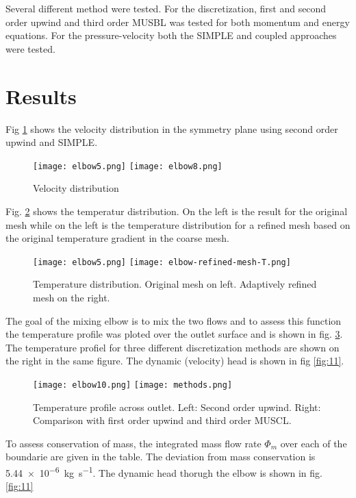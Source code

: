 \documentclass{article}
\begin{document}
Several different method were tested. For the discretization, first and second order upwind and third order MUSBL was tested for both momentum and energy equations. For the pressure-velocity both the SIMPLE and coupled approaches were tested.

\section{Results}

Fig \ref{fig:5} shows the velocity distribution in the symmetry plane using second order upwind and SIMPLE.

\begin{figure}[h]
\texttt{[image: elbow5.png]}
\texttt{[image: elbow8.png]}
\caption{Velocity distribution}
\label{fig:5}
\end{figure}

Fig. \ref{fig:6} shows the temperatur distribution. On the left is the result for the original mesh while on the left is the temperature distribution for a refined mesh based on the original temperature gradient in the coarse mesh.


\begin{figure}
\texttt{[image: elbow5.png]}
\texttt{[image: elbow-refined-mesh-T.png]}
\caption{Temperature distribution. Original mesh on left. Adaptively refined mesh on the right.}
\label{fig:6}
\end{figure}

The goal of the mixing elbow is to mix the two flows and to assess this function the temperature profile was ploted over the outlet surface and is shown in fig. \ref{fig:10}. The temperature profiel for three different discretization methods are shown on the right in the same figure. The dynamic (velocity) head is shown in fig \ref{fig:11}.

\begin{figure}
\texttt{[image: elbow10.png]}
\texttt{[image: methods.png]}
\caption{Temperature profile across outlet. Left: Second order upwind. Right: Comparison with first order upwind and third order MUSCL.}
\label{fig:10}
\end{figure}

To assess conservation of mass, the integrated mass flow rate $\Phi_m$ over each of the boundarie are given in the table. The deviation from mass conservation is \SI{5.44e-6}{\kilo\gram\per\second}. The dynamic head thorugh the elbow is shown in fig. \ref{fig:11}
\end{document}
